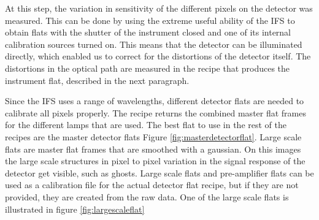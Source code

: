 \documentclass[twoside,single]{lion-msc}
\begin{document}
At this step, the variation in sensitivity of the different pixels on the detector was measured. This can be done by using the extreme useful ability of the IFS to obtain flats with the shutter of the instrument closed and one of its internal calibration sources turned on. This means that the detector can be illuminated directly, which enabled us to correct for the distortions of the detector itself. The distortions in the optical path are measured in the recipe that produces the instrument flat, described in the next paragraph. 
\bigskip

Since the IFS uses a range of wavelengths, different detector flats are needed to calibrate all pixels properly. The recipe returns the combined master flat frames for the different lamps that are used. The best flat to use in the rest of the recipes are the master detector flats Figure \ref{fig:masterdetectorflat}. Large scale flats are master flat frames that are smoothed with a gaussian. On this images the large scale structures in pixel to pixel variation in the signal response of the detector get visible, such as ghosts. Large scale flats and pre-amplifier flats can be used as a calibration file for the actual detector flat recipe, but if they are not provided, they are created from the raw data. One of the large scale flats is illustrated in figure \ref{fig:largescaleflat}
\end{document}

